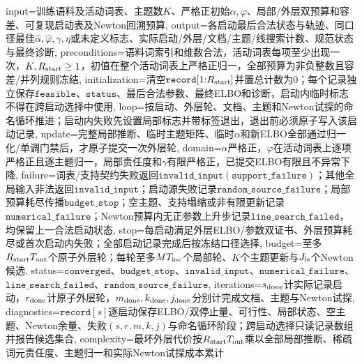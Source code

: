\begin{AlgorithmContract}{
  input={训练语料及活动词表、主题数$K$、严格正初始$\alpha,\varphi$、局部/外层双预算和容差、可复现启动表及Newton回溯预算},
  output={各启动最后合法状态与轨迹、同口径最佳$\widehat\alpha,\widehat\varphi,\gamma,\eta$或未定义标志、实际启动/外层/文档/主题/线搜索计数、规范状态与最终诊断},
  preconditions={语料词索引和维数合法，活动词表每项至少出现一次，$K,R_{\rm start}\ge1$，初值在整个活动词表上严格正归一，全部预算为非负整数且容差/并列规则冻结},
  initialization={清空$\mathtt{record}[1{:}R_{\rm start}]$并置总计数为$0$；每个记录独立保存$\mathtt{feasible}$、$\mathtt{status}$、最后合法参数、最终ELBO和诊断，启动内临时标志不得在跨启动选择中使用},
  loop={按启动、外层轮、文档、主题和Newton试探的命名循环推进；启动内失败先设置局部标志并带标签退出，退出前必须原子写入该启动记录},
  update={完整局部推断、临时主题矩阵、临时$\alpha$和新ELBO全部通过归一化/单调门禁后，才原子提交一次外层轮},
  domain={$\alpha$严格正，$\varphi$在活动词表上逐项严格正且逐主题归一，局部责任度和$\gamma$有限严格正，已提交ELBO有限且不异常下降},
  failure={词表/支持契约失败返回$\mathtt{invalid\_input}(\mathtt{support\_failure})$；其他全局输入非法返回$\mathtt{invalid\_input}$；启动源失败记录$\mathtt{random\_source\_failure}$；局部预算耗尽传播$\mathtt{budget\_stop}$；空主题、支持塌缩或非有限更新记录$\mathtt{numerical\_failure}$；Newton预算内无正参数上升步记录$\mathtt{line\_search\_failed}$，均保留上一合法启动状态},
  stop={每启动满足外层ELBO/参数双证书、外层预算耗尽或首次启动内失败；全部启动记录完成后按冻结口径选择},
  budget={至多$R_{\rm start}T_{\rm out}$个原子外层轮；每轮至多$M T_{\rm loc}$个局部轮、$K$个主题更新与$J_{\rm ls}$个Newton候选},
  status={$\mathtt{converged}$、$\mathtt{budget\_stop}$、$\mathtt{invalid\_input}$、$\mathtt{numerical\_failure}$、$\mathtt{line\_search\_failed}$、$\mathtt{random\_source\_failure}$},
  iterations={$s_{\rm done}$计实际记录启动，$r_{\rm done}$计原子外层轮，$m_{\rm done},k_{\rm done},j_{\rm done}$分别计完成文档、主题与Newton试探},
  diagnostics={$\mathtt{record}[s]$逐启动保存ELBO/双停止量、可行性、局部状态、空主题、Newton余量、失败$(s,r,m,k,j)$与命名循环阶段；跨启动选择只读记录数组并报告候选集合},
  complexity={最坏外层代价按$R_{\rm start}T_{\rm out}$乘以全部局部推断、稀疏词元责任度、主题归一和实际Newton试探成本累计}
}

\end{AlgorithmContract}
